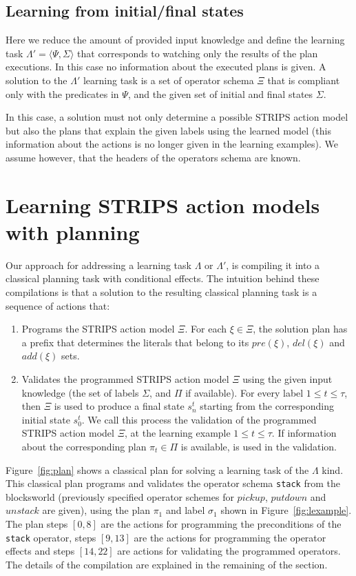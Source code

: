 \documentclass[letterpaper]{article} %
\newcommand{\tup}[1]{{\langle #1 \rangle}}
\begin{document}
\subsection{Learning from initial/final states}
Here we reduce the amount of provided input knowledge and define the learning task $\Lambda'=\tup{\Psi,\Sigma}$ that corresponds to watching only the results of the plan executions. In this case no information about the executed plans is given. A solution to the $\Lambda'$ learning task is a set of operator schema $\Xi$ that is compliant only with the predicates in $\Psi$, and the given set of initial and final states $\Sigma$.

In this case, a solution must not only determine a possible STRIPS action model but also the plans that explain the given labels using the learned model (this information about the actions is no longer given in the learning examples). We assume however, that the headers of the operators schema are known.


\section{Learning STRIPS action models with planning}
Our approach for addressing a learning task $\Lambda$ or $\Lambda'$, is compiling it into a classical planning task with conditional effects. The intuition behind these compilations is that a solution to the resulting classical planning task is a sequence of actions that:
\begin{enumerate}
\item Programs the STRIPS action model $\Xi$. For each $\xi\in\Xi$, the solution plan has a prefix that determines the literals that belong to its $pre(\xi)$, $del(\xi)$ and $add(\xi)$ sets.
\item Validates the programmed STRIPS action model $\Xi$ using the given input knowledge (the set of labels $\Sigma$, and $\Pi$ if available).  For every label {\small $1\leq t\leq \tau$}, then $\Xi$ is used to produce a final state $s_{n}^t$ starting from the corresponding initial state $s_0^t$. We call this process the validation of the programmed STRIPS action model $\Xi$, at the learning example {\small $1\leq t\leq \tau$}. If information about the corresponding plan $\pi_t\in \Pi$ is available, is used in the validation.
\end{enumerate}

Figure~\ref{fig:plan} shows a classical plan for solving a learning task of the $\Lambda$ kind. This classical plan programs and validates the operator schema {\tt\small stack} from the blocksworld (previously specified operator schemes for $pickup$, $putdown$ and $unstack$ are given), using the plan $\pi_1$ and label $\sigma_1$ shown in Figure~\ref{fig:lexample}. The plan steps $[0,8]$ are the actions for programming the preconditions of the {\tt\small stack} operator, steps $[9,13]$ are the actions for programming the operator effects and steps $[14,22]$ are actions for validating the programmed operators. The details of the compilation are explained in the remaining of the section.
\end{document}
